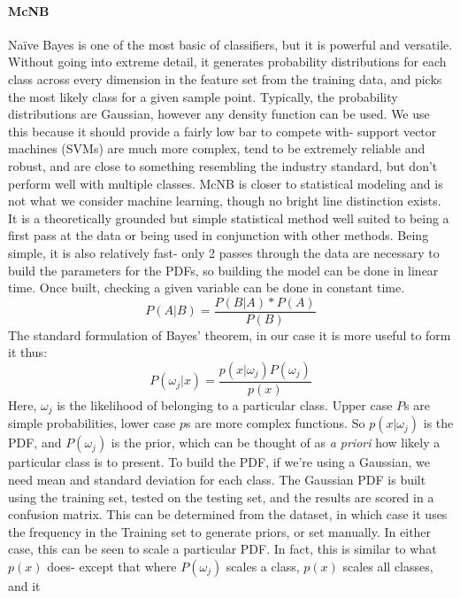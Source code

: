 \paragraph{McNB}
Na\"ive Bayes is one of the most basic of classifiers, but it is powerful and
versatile.  Without going into extreme detail, it generates probability
distributions for each class across every dimension in the feature set from the
training data, and picks the most likely class for a given sample point. 
Typically, the probability distributions are Gaussian, however any density
function can be used.   We use this because it should provide a fairly low bar
to compete with- support vector machines (SVMs) are much more complex, tend to
be extremely reliable and robust, and are close to something resembling the
industry standard, but don't perform well with multiple classes.  McNB is closer
to statistical modeling and is not what we consider machine learning, though no
bright line distinction exists.  It is a theoretically grounded but simple
statistical method well suited to being a first pass at the data or being used
in conjunction with other methods.  Being simple, it is also relatively fast-
only 2 passes through the data are necessary to build the parameters for the
PDFs, so building the model can be done in linear time.  Once built, checking a
given variable can be done in constant time.
\begin{equation}
P(A|B) = \frac{P(B|A)*P(A)}{P(B)}
\end{equation}
The standard formulation of Bayes' theorem, in our case it is more useful to
form it thus:
\begin{equation}
P(\omega_j|x) = \frac{p(x|\omega_j)P(\omega_j)}{p(x)}
\label{eq:bayes}
\end{equation}
Here, $\omega_j$ is the likelihood of belonging to a particular class.  Upper
case $P$s are simple probabilities, lower case $p$s are more complex functions.
So $p(x|\omega_j)$ is the PDF, and $P(\omega_j)$ is the prior, which can be
thought of as \textit{a priori} how likely a particular class is to present.  To
build the PDF, if we're using a Gaussian, we need mean and standard deviation
for each class.  The Gaussian PDF is built using the training set, tested on the
testing set, and the results are scored in a confusion matrix.  This can be
determined from the dataset, in which case it uses the frequency in the Training
set to generate priors, or set manually.  In either case, this can be seen to
scale a particular PDF.  In fact, this is similar to what $p(x)$ does- except
that where $P(\omega_j)$ scales a class, $p(x)$ scales all classes, and it
